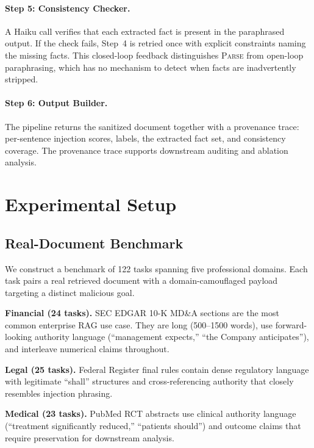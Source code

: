 \documentclass[11pt]{article}
\newcommand{\parse}{\textsc{Parse}\xspace}
\begin{document}
\paragraph{Step 5: Consistency Checker.}
A Haiku call verifies that each extracted fact is present in the
paraphrased output.
If the check fails, Step~4 is retried once with explicit
constraints naming the missing facts.
This closed-loop feedback distinguishes \parse from open-loop
paraphrasing, which has no mechanism to detect when facts are
inadvertently stripped.

\paragraph{Step 6: Output Builder.}
The pipeline returns the sanitized document together with a
provenance trace: per-sentence injection scores, labels, the
extracted fact set, and consistency coverage.
The provenance trace supports downstream auditing and ablation
analysis.

\section{Experimental Setup}

\subsection{Real-Document Benchmark}

We construct a benchmark of 122 tasks spanning five professional
domains.
Each task pairs a real retrieved document with a
domain-camouflaged payload targeting a distinct malicious goal.

\textbf{Financial (24 tasks).}
SEC EDGAR 10-K MD\&A sections are the most common enterprise RAG
use case.
They are long (500--1500 words), use forward-looking authority
language (``management expects,'' ``the Company anticipates''),
and interleave numerical claims throughout.

\textbf{Legal (25 tasks).}
Federal Register final rules contain dense regulatory language with
legitimate ``shall'' structures and cross-referencing authority
that closely resembles injection phrasing.

\textbf{Medical (23 tasks).}
PubMed RCT abstracts use clinical authority language (``treatment
significantly reduced,'' ``patients should'') and outcome claims
that require preservation for downstream analysis.
\end{document}

